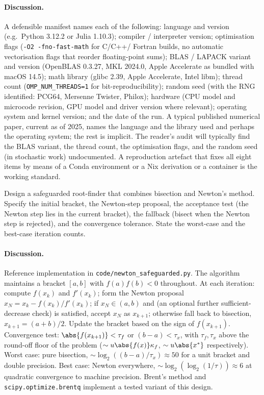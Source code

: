 \paragraph{Discussion.}
A defensible manifest names each of the following: language and
version (e.g.\ Python 3.12.2 or Julia 1.10.3); compiler / interpreter
version; optimisation flags (\texttt{-O2 -fno-fast-math} for C/C++/
Fortran builds, no automatic vectorisation flags that reorder
floating-point sums); BLAS / LAPACK variant and version (OpenBLAS
0.3.27, MKL 2024.0, Apple Accelerate as bundled with macOS 14.5);
math library (glibc 2.39, Apple Accelerate, Intel libm); thread
count (\texttt{OMP\_NUM\_THREADS=1} for bit-reproducibility);
random seed (with the RNG identified: PCG64, Mersenne Twister,
Philox); hardware (CPU model and microcode revision, GPU model
and driver version where relevant); operating system and kernel
version; and the date of the run. A typical published numerical
paper, current as of 2025, names the language and the library used
and perhaps the operating system; the rest is implicit. The
reader's audit will typically find the BLAS variant, the thread
count, the optimisation flags, and the random seed (in stochastic
work) undocumented. A reproduction artefact that fixes all eight
items by means of a Conda environment or a Nix derivation or a
container is the working standard.

\begin{exercise}
Design a safeguarded root-finder that combines bisection and
Newton's method. Specify the initial bracket, the Newton-step
proposal, the acceptance test (the Newton step lies in the
current bracket), the fallback (bisect when the Newton step is
rejected), and the convergence tolerance. State the worst-case
and the best-case iteration counts.
\end{exercise}

\paragraph{Discussion.}
Reference implementation in \texttt{code/newton\_safeguarded.py}.
The algorithm maintains a bracket $[a, b]$ with $f(a) f(b) < 0$
throughout. At each iteration: compute $f(x_{k})$ and $f'(x_{k})$;
form the Newton proposal $x_{N} = x_{k} - f(x_{k})/f'(x_{k})$; if
$x_{N} \in (a, b)$ and (an optional further sufficient-decrease
check) is satisfied, accept $x_{N}$ as $x_{k+1}$; otherwise fall
back to bisection, $x_{k+1} = (a + b)/2$. Update the bracket
based on the sign of $f(x_{k+1})$. Convergence test:
$\abs{f(x_{k+1})} < \tau_{f}$ or $(b - a) < \tau_{x}$, with
$\tau_{f}, \tau_{x}$ above the round-off floor of the problem
($\sim u \abs{f(x)} \kappa_{f}$, $\sim u \abs{x^{*}}$
respectively). Worst case: pure bisection, $\sim \log_{2}((b-a)/
\tau_{x}) \approx 50$ for a unit bracket and double precision.
Best case: Newton everywhere, $\sim \log_{2}(\log_{2}(1/\tau))
\approx 6$ at quadratic convergence to machine precision. Brent's
method and \texttt{scipy.optimize.brentq} implement a tested
variant of this design.

